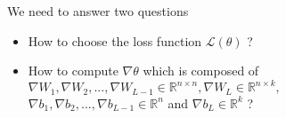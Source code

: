 \savestack{\nnfruitclassexample}{}
\savestack{\nnimdbexample}{}
\savestack{\nn}{}


\begin{frame}
\end{frame}

\begin{frame}
  \begin{block}{We need to answer two questions}
    \begin{itemize}
      \item \alert<2>{How to choose the loss function $\mathscr{L}(\theta)$ ?} \color{black}
      \item How to compute $\nabla \theta$ which is composed of $\nabla W_1, \nabla W_2, ..., \nabla W_{L-1} \in \mathbb{R}^{n \times n}, \nabla W_L \in \mathbb{R}^{n \times k},$ \\ $\nabla b_1, \nabla b_2, ..., \nabla b_{L-1} \in \mathbb{R}^n $ and $\nabla b_L \in \mathbb{R}^k$ ?
    \end{itemize}
  \end{block}
\end{frame}

